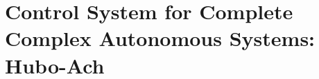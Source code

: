\chapter{Control System for Complete Complex Autonomous Systems: Hubo-Ach}\label{sec:hubo-ach}






